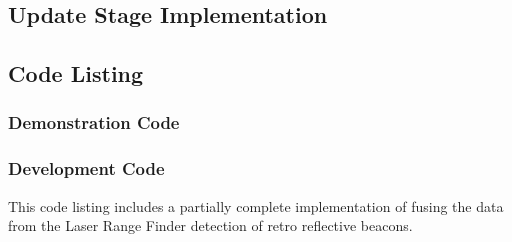 		\pagebreak
	\subsection{Update Stage Implementation}



		\pagebreak
	\subsection{Code Listing}
		\subsubsection{Demonstration Code}
			
			\pagebreak
		\subsubsection{Development Code}
			This code listing includes a partially complete implementation of fusing the data from the Laser Range Finder detection of retro reflective beacons.
			
			\pagebreak